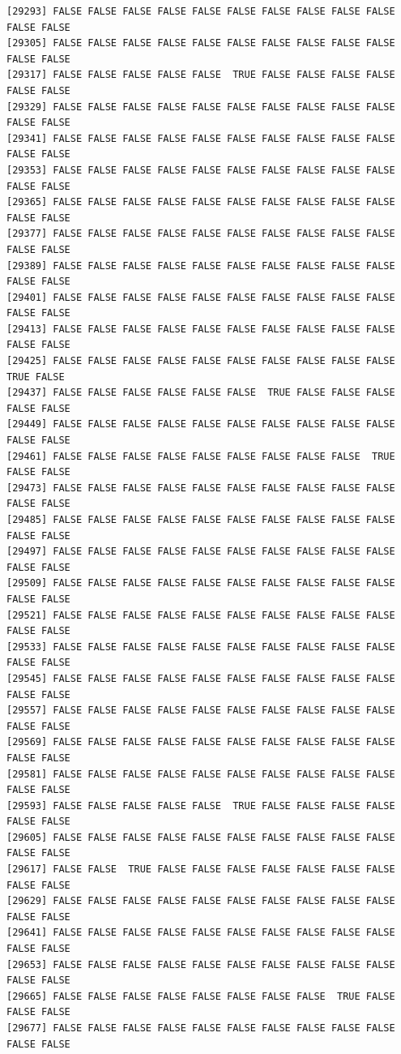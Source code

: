 \documentclass[
  a4paper,
  DIV=11,
  numbers=noendperiod]{scrartcl}
\begin{document}
\begin{verbatim}
[29293] FALSE FALSE FALSE FALSE FALSE FALSE FALSE FALSE FALSE FALSE FALSE FALSE
[29305] FALSE FALSE FALSE FALSE FALSE FALSE FALSE FALSE FALSE FALSE FALSE FALSE
[29317] FALSE FALSE FALSE FALSE FALSE  TRUE FALSE FALSE FALSE FALSE FALSE FALSE
[29329] FALSE FALSE FALSE FALSE FALSE FALSE FALSE FALSE FALSE FALSE FALSE FALSE
[29341] FALSE FALSE FALSE FALSE FALSE FALSE FALSE FALSE FALSE FALSE FALSE FALSE
[29353] FALSE FALSE FALSE FALSE FALSE FALSE FALSE FALSE FALSE FALSE FALSE FALSE
[29365] FALSE FALSE FALSE FALSE FALSE FALSE FALSE FALSE FALSE FALSE FALSE FALSE
[29377] FALSE FALSE FALSE FALSE FALSE FALSE FALSE FALSE FALSE FALSE FALSE FALSE
[29389] FALSE FALSE FALSE FALSE FALSE FALSE FALSE FALSE FALSE FALSE FALSE FALSE
[29401] FALSE FALSE FALSE FALSE FALSE FALSE FALSE FALSE FALSE FALSE FALSE FALSE
[29413] FALSE FALSE FALSE FALSE FALSE FALSE FALSE FALSE FALSE FALSE FALSE FALSE
[29425] FALSE FALSE FALSE FALSE FALSE FALSE FALSE FALSE FALSE FALSE  TRUE FALSE
[29437] FALSE FALSE FALSE FALSE FALSE FALSE  TRUE FALSE FALSE FALSE FALSE FALSE
[29449] FALSE FALSE FALSE FALSE FALSE FALSE FALSE FALSE FALSE FALSE FALSE FALSE
[29461] FALSE FALSE FALSE FALSE FALSE FALSE FALSE FALSE FALSE  TRUE FALSE FALSE
[29473] FALSE FALSE FALSE FALSE FALSE FALSE FALSE FALSE FALSE FALSE FALSE FALSE
[29485] FALSE FALSE FALSE FALSE FALSE FALSE FALSE FALSE FALSE FALSE FALSE FALSE
[29497] FALSE FALSE FALSE FALSE FALSE FALSE FALSE FALSE FALSE FALSE FALSE FALSE
[29509] FALSE FALSE FALSE FALSE FALSE FALSE FALSE FALSE FALSE FALSE FALSE FALSE
[29521] FALSE FALSE FALSE FALSE FALSE FALSE FALSE FALSE FALSE FALSE FALSE FALSE
[29533] FALSE FALSE FALSE FALSE FALSE FALSE FALSE FALSE FALSE FALSE FALSE FALSE
[29545] FALSE FALSE FALSE FALSE FALSE FALSE FALSE FALSE FALSE FALSE FALSE FALSE
[29557] FALSE FALSE FALSE FALSE FALSE FALSE FALSE FALSE FALSE FALSE FALSE FALSE
[29569] FALSE FALSE FALSE FALSE FALSE FALSE FALSE FALSE FALSE FALSE FALSE FALSE
[29581] FALSE FALSE FALSE FALSE FALSE FALSE FALSE FALSE FALSE FALSE FALSE FALSE
[29593] FALSE FALSE FALSE FALSE FALSE  TRUE FALSE FALSE FALSE FALSE FALSE FALSE
[29605] FALSE FALSE FALSE FALSE FALSE FALSE FALSE FALSE FALSE FALSE FALSE FALSE
[29617] FALSE FALSE  TRUE FALSE FALSE FALSE FALSE FALSE FALSE FALSE FALSE FALSE
[29629] FALSE FALSE FALSE FALSE FALSE FALSE FALSE FALSE FALSE FALSE FALSE FALSE
[29641] FALSE FALSE FALSE FALSE FALSE FALSE FALSE FALSE FALSE FALSE FALSE FALSE
[29653] FALSE FALSE FALSE FALSE FALSE FALSE FALSE FALSE FALSE FALSE FALSE FALSE
[29665] FALSE FALSE FALSE FALSE FALSE FALSE FALSE FALSE  TRUE FALSE FALSE FALSE
[29677] FALSE FALSE FALSE FALSE FALSE FALSE FALSE FALSE FALSE FALSE FALSE FALSE

\end{verbatim}
\end{document}
